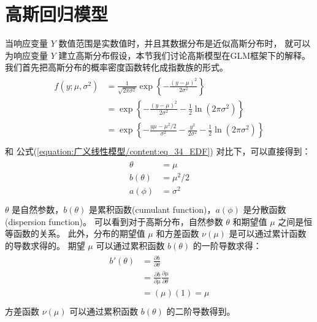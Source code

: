 \documentclass[letterpaper,10pt,english]{sphinxmanual}
\begin{document}
\section{高斯回归模型}
\label{\detokenize{_u9ad8_u65af_u6a21_u578b/content:id4}}
当响应变量 \(Y\) 数值范围是实数值时，并且其数据分布是近似高斯分布时，
就可以为响应变量 \(Y\) 建立高斯分布假设，本节我们讨论高斯模型在GLM框架下的解释。
我们首先把高斯分布的概率密度函数转化成指数族的形式。
\begin{align}\label{equation:高斯模型/content:eq_gaussian_010}\!\begin{aligned}
f(y;\mu,\sigma^2) &=\frac{1}{\sqrt{2\pi \sigma^2}} \exp \left \{ - \frac{(y-\mu)^2}{2\sigma^2} \right \}\\
&= \exp \left \{ -\frac{(y-\mu)^2}{2\sigma^2} - \frac{1}{2} \ln (2\pi\sigma^2) \right \}\\
&= \exp \left \{ -\frac{y\mu - \mu^2/2}{\sigma^2} - \frac{y^2}{2\sigma^2} - \frac{1}{2} \ln (2\pi\sigma^2) \right \}\\
\end{aligned}\end{align}
和 公式(\ref{equation:广义线性模型/content:eq_34_EDF}) 对比下，可以直接得到：
\begin{align}\label{equation:高斯模型/content:eq_gaussian_0010}\!\begin{aligned}
\theta &= \mu\\
b(\theta) &= \mu^2/2\\
a(\phi) &= \sigma^2\\
\end{aligned}\end{align}
\(\theta\) 是自然参数，\(b(\theta)\) 是累积函数(cumulant function)，\(a(\phi)\) 是分散函数(dispersion function)。
可以看到对于高斯分布，自然参数 \(\theta\) 和期望值 \(\mu\) 之间是恒等函数的关系。
此外，分布的期望值 \(\mu\) 和方差函数 \(\nu(\mu)\) 是可以通过累计函数的导数求得的。
期望 \(\mu\) 可以通过累积函数 \(b(\theta)\) 的一阶导数求得：
\begin{align}\label{equation:高斯模型/content:高斯模型/content:2}\!\begin{aligned}
b'(\theta) &= \frac{\partial b}{\partial \theta}\\
&= \frac{\partial b}{\partial \mu} \frac{\partial \mu}{\partial \theta}\\
&= (\mu)(1) = \mu\\
\end{aligned}\end{align}
方差函数 \(\nu(\mu)\) 可以通过累积函数 \(b(\theta)\) 的二阶导数得到。
\end{document}
